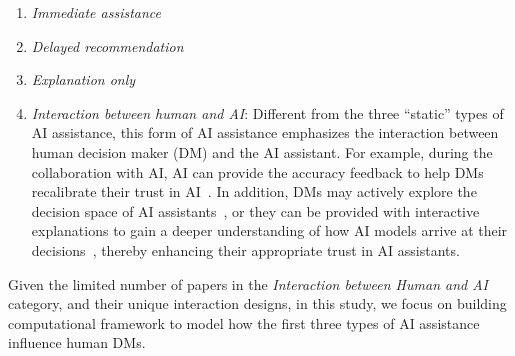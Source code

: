 \documentclass[letterpaper]{article} %
\begin{document}
\begin{enumerate}
    \item \emph{Immediate assistance}~\cite{Lai2018OnHP,Liu2021UnderstandingTE,Nourani2021AnchoringBA,Green2019ThePA,Tsai2021ExploringAP,Bansal2020DoesTW,Buccinca2021ToTO,Feng2018WhatCA,Guo2019VisualizingUA,Lee2020CoDesignAE,Lee2021AHC,Levy2021AssessingTI,Cheng2019ExplainingDA,Lai2020WhyI,PoursabziSangdeh2018ManipulatingAM,Chromik2021ITI,Jacobs2021DesigningAF,SmithRenner2020NoEW,Desmond2021IncreasingTS,Buccinca2020ProxyTA,Gajos2022DoPE,Gomez2020ViCEVC,Abdul2020COGAMMA,Brown2019TowardAA, Cai2019TheEO, Buccinca2020ProxyTA,Szymanski2021VisualTO,Green2019DisparateIA,DeArteaga2020ACF,Yang2020HowDV,Kunkel2019LetME,Das2020LeveragingRT,Yu2019DoIT,10.1145/3359284,Harrison2020AnES,Kocielnik2019WillYA}

    \item \emph{Delayed recommendation}~\cite{Zhang2020EffectOC,Dodge2019ExplainingMA,Wang2021AreEH,Yin2019UnderstandingTE,Buccinca2021ToTO,Lu2021HumanRO,PoursabziSangdeh2018ManipulatingAM,10.1145/3359280,Park2019ASA}

    \item \emph{Explanation only}~\cite{Lai2018OnHP,Alqaraawi2020EvaluatingSM,Lucic2019WhyDM,Rader2018ExplanationsAM,Berkel2021EffectOI,Buccinca2020ProxyTA,Gajos2022DoPE,Anik2021DataCentricEE,Lucic2019WhyDM,Rader2018ExplanationsAM}

    \item \emph{Interaction between human and AI}: Different from the three ``static'' types of AI assistance, this form of AI assistance emphasizes the interaction between human decision maker (DM) and the AI assistant. For example, during the collaboration with AI, AI can provide the accuracy feedback to help DMs recalibrate their trust in AI~\cite{Bansal2020DoesTW,Yu2019DoIT}. In addition, DMs may actively explore the decision space of AI assistants~\cite{10.1145/3290605.3300234,10.1145/3411764.3445522}, or they can be provided with interactive explanations to gain a deeper understanding of how AI models arrive at their decisions~\cite{10.1145/3290605.3300234, Yang2020HowDV, SmithRenner2020NoEW,Liu2021UnderstandingTE,Cai2019HumanCenteredTF}, thereby enhancing their appropriate trust in AI assistants.

\end{enumerate}
Given the limited number of papers in the \emph{Interaction between Human and AI} category, and their unique interaction designs, in this study, we focus on building computational framework to model how the first three types of AI assistance influence human DMs.
\end{document}
